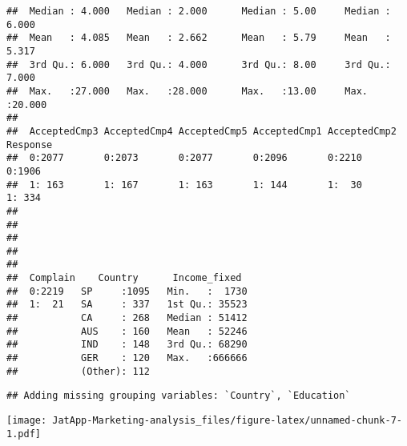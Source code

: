 \documentclass[]{article}
\newenvironment{Shaded}{\begin{snugshade}}{\end{snugshade}}
\newcommand{\CommentTok}[1]{\textcolor[rgb]{0.56,0.35,0.01}{\textit{#1}}}
\newcommand{\DataTypeTok}[1]{\textcolor[rgb]{0.13,0.29,0.53}{#1}}
\newcommand{\KeywordTok}[1]{\textcolor[rgb]{0.13,0.29,0.53}{\textbf{#1}}}
\newcommand{\NormalTok}[1]{#1}
\newcommand{\OperatorTok}[1]{\textcolor[rgb]{0.81,0.36,0.00}{\textbf{#1}}}
\newcommand{\StringTok}[1]{\textcolor[rgb]{0.31,0.60,0.02}{#1}}
\begin{document}
\begin{verbatim}
##  Median : 4.000   Median : 2.000      Median : 5.00     Median : 6.000   
##  Mean   : 4.085   Mean   : 2.662      Mean   : 5.79     Mean   : 5.317   
##  3rd Qu.: 6.000   3rd Qu.: 4.000      3rd Qu.: 8.00     3rd Qu.: 7.000   
##  Max.   :27.000   Max.   :28.000      Max.   :13.00     Max.   :20.000   
##                                                                          
##  AcceptedCmp3 AcceptedCmp4 AcceptedCmp5 AcceptedCmp1 AcceptedCmp2 Response
##  0:2077       0:2073       0:2077       0:2096       0:2210       0:1906  
##  1: 163       1: 167       1: 163       1: 144       1:  30       1: 334  
##                                                                           
##                                                                           
##                                                                           
##                                                                           
##                                                                           
##  Complain    Country      Income_fixed   
##  0:2219   SP     :1095   Min.   :  1730  
##  1:  21   SA     : 337   1st Qu.: 35523  
##           CA     : 268   Median : 51412  
##           AUS    : 160   Mean   : 52246  
##           IND    : 148   3rd Qu.: 68290  
##           GER    : 120   Max.   :666666  
##           (Other): 112
\end{verbatim}

\begin{Shaded}
\end{Shaded}

\begin{verbatim}
## Adding missing grouping variables: `Country`, `Education`
\end{verbatim}

\texttt{[image: JatApp-Marketing-analysis\_files/figure-latex/unnamed-chunk-7-1.pdf]}
\end{document}
